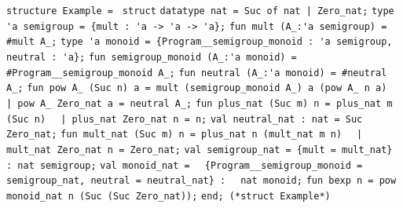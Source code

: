 \begin{isabellebody}
\begin{isamarkuptext}
\verb|structure Example = |\newline%
\verb|struct|\newline%
\newline%
\verb|datatype nat = Suc of nat |\verb,|,\verb| Zero_nat;|\newline%
\newline%
\verb|type 'a semigroup = {mult : 'a -> 'a -> 'a};|\newline%
\verb|fun mult (A_:'a semigroup) = #mult A_;|\newline%
\newline%
\verb|type 'a monoid = {Program__semigroup_monoid : 'a semigroup, neutral : 'a};|\newline%
\verb|fun semigroup_monoid (A_:'a monoid) = #Program__semigroup_monoid A_;|\newline%
\verb|fun neutral (A_:'a monoid) = #neutral A_;|\newline%
\newline%
\verb|fun pow A_ (Suc n) a = mult (semigroup_monoid A_) a (pow A_ n a)|\newline%
\verb|  |\verb,|,\verb| pow A_ Zero_nat a = neutral A_;|\newline%
\newline%
\verb|fun plus_nat (Suc m) n = plus_nat m (Suc n)|\newline%
\verb|  |\verb,|,\verb| plus_nat Zero_nat n = n;|\newline%
\newline%
\verb|val neutral_nat : nat = Suc Zero_nat;|\newline%
\newline%
\verb|fun mult_nat (Suc m) n = plus_nat n (mult_nat m n)|\newline%
\verb|  |\verb,|,\verb| mult_nat Zero_nat n = Zero_nat;|\newline%
\newline%
\verb|val semigroup_nat = {mult = mult_nat} : nat semigroup;|\newline%
\newline%
\verb|val monoid_nat =|\newline%
\verb|  {Program__semigroup_monoid = semigroup_nat, neutral = neutral_nat} :|\newline%
\verb|  nat monoid;|\newline%
\newline%
\verb|fun bexp n = pow monoid_nat n (Suc (Suc Zero_nat));|\newline%
\newline%
\verb|end; (*struct Example*)|%

\end{isamarkuptext}
\end{isabellebody}
